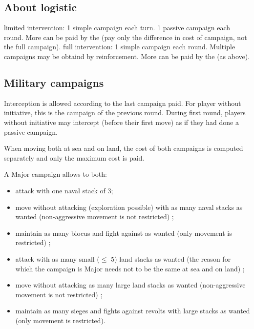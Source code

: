 \subsection{About logistic}

\bparag limited intervention: 1 simple campaign each turn. 1 passive campaign
each round. More can be paid by the \MAJ (pay only the difference in cost of
campaign, not the full campaign).
\bparag full intervention: 1 simple campaign each round. Multiple campaigns
may be obtaind by reinforcement. More can be paid by the \MAJ (as above).


\subsection{Military campaigns}
\aparag Interception is allowed according to the last campaign paid.
\bparag For player without initiative, this is the campaign of the previous
round.
\bparag During first round, players without initiative may intercept (before
their first move) as if they had done a passive campaign.

\aparag When moving both at sea and on land, the cost of both campaigns is
computed separately and only the maximum cost is paid.
\begin{exemple}
  A Major campaign allows to both:
  \begin{itemize}
  \item attack with one naval stack of 3\FLEET ;
  \item move without attacking (exploration possible) with as many naval
    stacks as wanted (non-aggressive movement is not restricted) ;
  \item maintain as many blocus and fight against \corsaire as wanted (only
    movement is restricted) ;
  \item attack with as many small ($\leq$ 5\LD) land stacks as wanted (the
    reason for which the campaign is Major needs not to be the same at sea and
    on land) ;
  \item move without attacking as many large land stacks as wanted
    (non-aggressive movement is not restricted) ;
  \item maintain as many sieges and fights against revolts with large stacks as
    wanted (only movement is restricted).
  \end{itemize}
\end{exemple}

